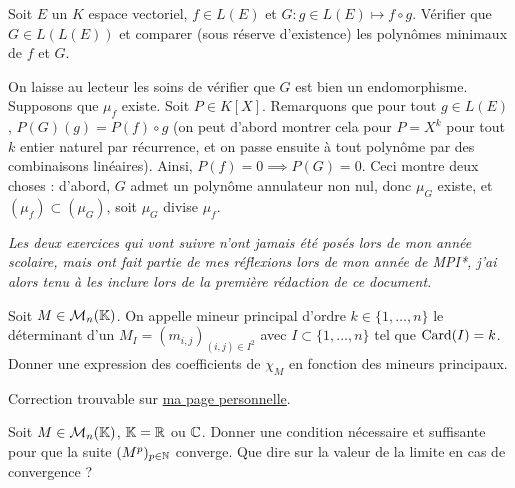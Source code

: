 \begin{exo}
	\label{reduction5}
    Soit $E$ un $K$ espace vectoriel, $f\in L(E)$ et $G:g\in L(E)\mapsto f\circ g$. Vérifier que $G\in L(L(E))$ et comparer (sous réserve d'existence) les polynômes minimaux de $f$ et $G$.
\end{exo}

\begin{solution}
	On laisse au lecteur les soins de vérifier que $G$ est bien un endomorphisme. 
    Supposons que $\mu_f$ existe. 
    Soit $P\in K[X]$. 
    Remarquons que pour tout $g\in L(E)$, $P(G)(g)=P(f)\circ g$ (on peut d'abord montrer cela pour $P=X^k$ pour tout $k$ entier naturel par récurrence, 
    et on passe ensuite à tout polynôme par des combinaisons linéaires). Ainsi, $P(f)=0\implies P(G)=0$. 
    Ceci montre deux choses : d'abord, $G$ admet un polynôme annulateur non nul, donc $\mu_G$ existe, et $(\mu_f)\subset (\mu_G)$, soit $\mu_G$ divise $\mu_f$. 
\end{solution}

\textit{Les deux exercices qui vont suivre n'ont jamais été posés lors de mon année scolaire, mais ont fait partie de mes réflexions lors de mon année de MPI*, j'ai alors tenu à les inclure lors de la première rédaction de ce document.}

\begin{exo}
	\label{reduction6}
	Soit $M\in\mathcal M_n(\operatorname{\mathbb K})$. On appelle mineur principal d'ordre $k\in\lbrace1,\dots,n\rbrace$ le déterminant d'un $M_I=(m_{i,j})_{(i,j)\in I^2}$ avec $I\subset\lbrace 1,\dots,n\rbrace$ tel que $\operatorname{Card}(I)=k$. Donner une expression des coefficients de $\chi_M$ en fonction des mineurs principaux.
\end{exo}

\begin{solution}
    Correction trouvable sur \href{https://perso.eleves.ens-rennes.fr/people/amar.ahmane}{ma page personnelle}.
\end{solution}

\begin{exo}
	\label{reduction7}
	Soit $M\in\mathcal M_n(\operatorname{\mathbb K})$, $\operatorname{\mathbb K} = \operatorname{\mathbb R}$ ou $\operatorname{\mathbb C}$. Donner une condition nécessaire et suffisante pour que la suite $(M^p)_{p\in\operatorname{\mathbb N}}$ converge. Que dire sur la valeur de la limite en cas de convergence ?
\end{exo}

